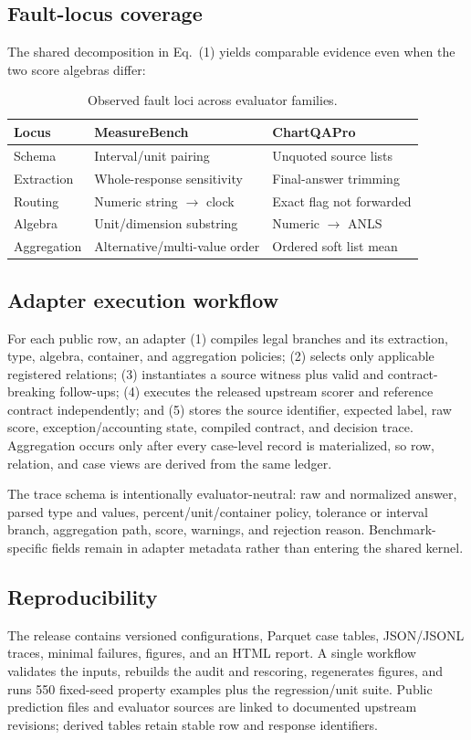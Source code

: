 \subsection{Fault-locus coverage}
The shared decomposition in Eq.~(1) yields comparable evidence even when the two score algebras differ:
\begin{table}[H]
\centering
\caption{Observed fault loci across evaluator families.}
\label{tab:fault-loci}
\scriptsize
\setlength{\tabcolsep}{3.0pt}
\begin{tabular}{lll}
\toprule
Locus & MeasureBench & ChartQAPro\\
\midrule
Schema & Interval/unit pairing & Unquoted source lists\\
Extraction & Whole-response sensitivity & Final-answer trimming\\
Routing & Numeric string $\rightarrow$ clock & Exact flag not forwarded\\
Algebra & Unit/dimension substring & Numeric $\rightarrow$ ANLS\\
Aggregation & Alternative/multi-value order & Ordered soft list mean\\
\bottomrule
\end{tabular}
\end{table}

\subsection{Adapter execution workflow}
For each public row, an adapter (1) compiles legal branches and its extraction, type, algebra, container, and aggregation policies; (2) selects only applicable registered relations; (3) instantiates a source witness plus valid and contract-breaking follow-ups; (4) executes the released upstream scorer and reference contract independently; and (5) stores the source identifier, expected label, raw score, exception/accounting state, compiled contract, and decision trace. Aggregation occurs only after every case-level record is materialized, so row, relation, and case views are derived from the same ledger.

The trace schema is intentionally evaluator-neutral: raw and normalized answer, parsed type and values, percent/unit/container policy, tolerance or interval branch, aggregation path, score, warnings, and rejection reason. Benchmark-specific fields remain in adapter metadata rather than entering the shared kernel.
\subsection{Reproducibility}
The release contains versioned configurations, Parquet case tables, JSON/JSONL traces, minimal failures, figures, and an HTML report. A single workflow validates the inputs, rebuilds the audit and rescoring, regenerates figures, and runs 550 fixed-seed property examples plus the regression/unit suite. Public prediction files and evaluator sources are linked to documented upstream revisions; derived tables retain stable row and response identifiers.

